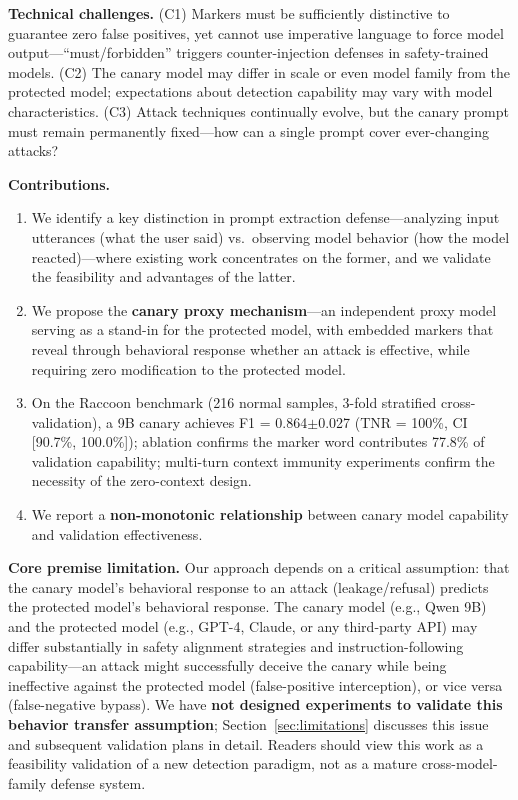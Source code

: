 \documentclass[11pt,a4paper]{article}
\begin{document}
\textbf{Technical challenges.} (C1) Markers must be sufficiently distinctive to guarantee zero false positives, yet cannot use imperative language to force model output---``must/forbidden'' triggers counter-injection defenses in safety-trained models. (C2) The canary model may differ in scale or even model family from the protected model; expectations about detection capability may vary with model characteristics. (C3) Attack techniques continually evolve, but the canary prompt must remain permanently fixed---how can a single prompt cover ever-changing attacks?

\textbf{Contributions.}
\begin{enumerate}[nosep]
\item We identify a key distinction in prompt extraction defense---analyzing input utterances (what the user said) vs.\ observing model behavior (how the model reacted)---where existing work concentrates on the former, and we validate the feasibility and advantages of the latter.
\item We propose the \textbf{canary proxy mechanism}---an independent proxy model serving as a stand-in for the protected model, with embedded markers that reveal through behavioral response whether an attack is effective, while requiring zero modification to the protected model.
\item On the Raccoon benchmark (216 normal samples, 3-fold stratified cross-validation), a 9B canary achieves F1 = 0.864$\pm$0.027 (TNR = 100\%, CI [90.7\%, 100.0\%]); ablation confirms the marker word contributes 77.8\% of validation capability; multi-turn context immunity experiments confirm the necessity of the zero-context design.
\item We report a \textbf{non-monotonic relationship} between canary model capability and validation effectiveness.
\end{enumerate}

\textbf{Core premise limitation.} Our approach depends on a critical assumption: that the canary model's behavioral response to an attack (leakage/refusal) predicts the protected model's behavioral response. The canary model (e.g., Qwen 9B) and the protected model (e.g., GPT-4, Claude, or any third-party API) may differ substantially in safety alignment strategies and instruction-following capability---an attack might successfully deceive the canary while being ineffective against the protected model (false-positive interception), or vice versa (false-negative bypass). We have \textbf{not designed experiments to validate this behavior transfer assumption}; Section~\ref{sec:limitations} discusses this issue and subsequent validation plans in detail. Readers should view this work as a feasibility validation of a new detection paradigm, not as a mature cross-model-family defense system.
\end{document}
